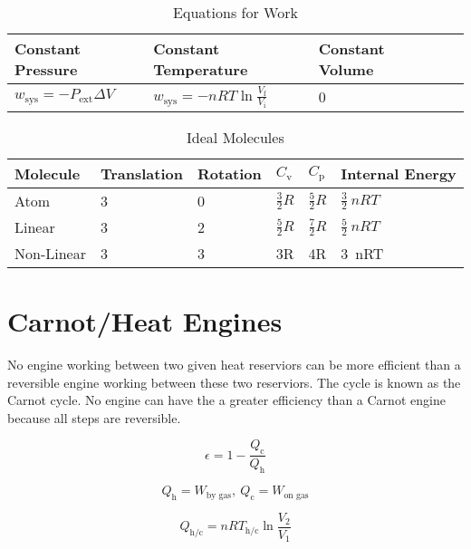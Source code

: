 \documentclass{article}
\begin{document}
\begin{table}[h]
\centering
\caption{Equations for Work}
\label{my-label}
\def\arraystretch{1.5}
\begin{tabular}{|l|l|l|l|l|}
\hline
Constant Pressure & Constant Temperature & Constant Volume   \\
\hline
$w_\text{sys} = - P_{\text{ext}} \Delta V$   & $w_\text{sys} = - n R T\ln{\frac{V_\text{f}}{V_\text{i}}}$ & 0 \\
\hline
\end{tabular}
\end{table}

\begin{table}[h!]
\centering
\caption{Ideal Molecules}
\label{my-label}
\def\arraystretch{1.5}
\begin{tabular}{|l|l|l|l|l|l|}
\hline
Molecule & Translation & Rotation & $C_\text{v}$ & $C_\text{p}$ & Internal Energy  \\
\hline
Atom & 3 & 0 & $\frac{3}{2}R$ & $\frac{5}{2}R$ & $\frac{3}{2}\ nRT$\\
\hline
Linear & 3 & 2 & $\frac{5}{2}R$& $\frac{7}{2}R$ & $\frac{5}{2}\ nRT$\\
\hline
Non-Linear & 3 & 3 & 3R & 4R & 3\ nRT\\
\hline
\end{tabular}
\end{table}

\section{Carnot/Heat Engines}

No engine working between two given heat reserviors can be more efficient than a reversible engine working between these two reserviors. The cycle is known as the Carnot cycle. No engine can have the a greater efficiency than a Carnot engine because all steps are reversible.

\begin{equation*}
\epsilon = 1 - \frac{Q_\text{c}}{Q_\text{h}}
\end{equation*}

\begin{equation*}
Q_\text{h} = W_\text{by gas},\ Q_\text{c} = W_\text{on gas} 
\end{equation*}

\begin{equation*}
Q_\text{h/c} = nRT_\text{h/c} \ln\frac{V_\text{2}}{V_\text{1}}
\end{equation*}
\end{document}
